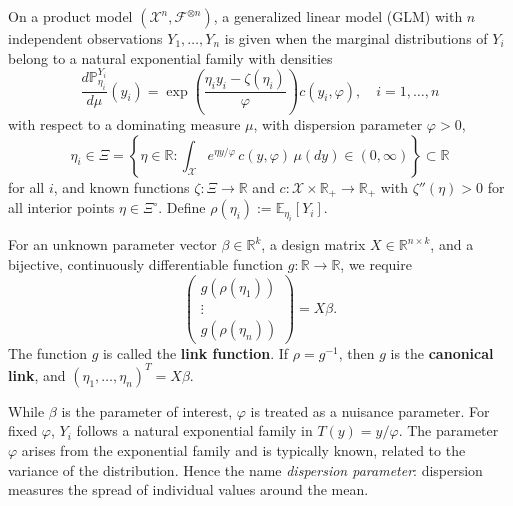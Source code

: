 \begin{definition}
On a product model $(\mathcal{X}^n, \mathcal{F}^{\otimes n})$, a generalized linear model (GLM) with $n$ independent observations $Y_1, \dots, Y_n$ is given when the marginal distributions of $Y_i$ belong to a natural exponential family with densities
\begin{equation}
	\frac{d\mathbb{P}_{\eta_i}^{Y_i}}{d\mu}(y_i) = \exp\left(\frac{\eta_i y_i - \zeta(\eta_i)}{\varphi}\right) c(y_i, \varphi), \quad i = 1, \dots, n
\end{equation}
with respect to a dominating measure $\mu$, with dispersion parameter $\varphi > 0$,
\begin{equation*}
	\eta_i \in \Xi = \left\{ \eta \in \mathbb{R} : \int_{\mathcal{X}} e^{\eta y / \varphi}\, c(y, \varphi)\, \mu(dy) \in (0, \infty) \right\} \subset \mathbb{R}
\end{equation*}
for all $i$, and known functions $\zeta \colon \Xi \to \mathbb{R}$ and $c \colon \mathcal{X} \times \mathbb{R}_+ \to \mathbb{R}_+$ with $\zeta''(\eta) > 0$ for all interior points $\eta \in \Xi^\circ$. Define $\rho(\eta_i) := \mathbb{E}_{\eta_i}[Y_i]$.

For an unknown parameter vector $\beta \in \mathbb{R}^k$, a design matrix $X \in \mathbb{R}^{n \times k}$, and a bijective, continuously differentiable function $g \colon \mathbb{R} \to \mathbb{R}$, we require
\begin{equation}
	\begin{pmatrix} g(\rho(\eta_1)) \\ \vdots \\ g(\rho(\eta_n)) \end{pmatrix} = X\beta.
\end{equation}
The function $g$ is called the \textbf{link function}. If $\rho = g^{-1}$, then $g$ is the \textbf{canonical link}, and $(\eta_1, \dots, \eta_n)^T = X\beta$.
\end{definition}

\begin{remark}
While $\beta$ is the parameter of interest, $\varphi$ is treated as a nuisance parameter. For fixed $\varphi$, $Y_i$ follows a natural exponential family in $T(y) = y/\varphi$. The parameter $\varphi$ arises from the exponential family and is typically known, related to the variance of the distribution. Hence the name \emph{dispersion parameter}: dispersion measures the spread of individual values around the mean.
\end{remark}


